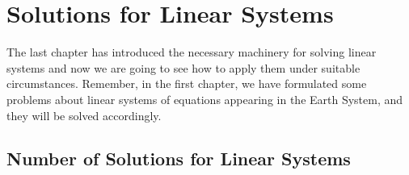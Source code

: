 \chapter{Solutions for Linear Systems}
\label{chap:SolLinSys}

The last chapter has introduced the necessary machinery for solving linear systems and now we are going to see how to apply them under suitable circumstances. Remember, in the first chapter, we have formulated some problems about linear systems of equations appearing in the Earth System, and they will be solved accordingly.

\section{Number of Solutions for Linear Systems}

